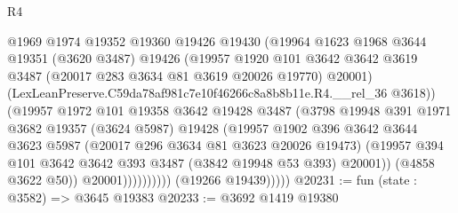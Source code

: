 \begin{lexlean}{R4}
\begin{coremodule}
                              @1969
                              @1974
                              @19352
                              @19360
                              @19426
                              @19430
                              (@19964
                                @1623
                                @1968
                                @3644
                                @19351
                                (@3620 @3487)
                                @19426
                                (@19957
                                  @1920
                                  @101
                                  @3642
                                  @3642
                                  @3619
                                  @3487
                                  (@20017 @283 @3634 @81 @3619 @20026 @19770)
                                  @20001)
                                (LexLeanPreserve.C59da78af981c7e10f46266c8a8b8b11e.R4.__rel_36
                                  @3618))
                              (@19957
                                @1972
                                @101
                                @19358
                                @3642
                                @19428
                                @3487
                                (@3798
                                  @19948
                                  @391
                                  @1971
                                  @3682
                                  @19357
                                  (@3624 @5987)
                                  @19428
                                  (@19957
                                    @1902
                                    @396
                                    @3642
                                    @3644
                                    @3623
                                    @5987
                                    (@20017 @296 @3634 @81 @3623 @20026 @19473)
                                    (@19957
                                      @394
                                      @101
                                      @3642
                                      @3642
                                      @393
                                      @3487
                                      (@3842 @19948 @53 @393)
                                      @20001))
                                  (@4858 @3622 @50))
                                @20001))))))))))
            (@19266 @19439)))))
@20231 := fun (state : @3582) => @3645 @19383
@20233 := @3692 @1419 @19380

\end{coremodule}
\end{lexlean}
